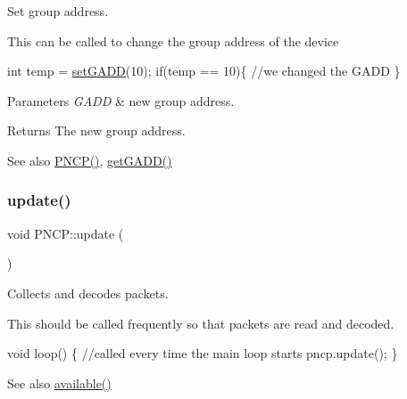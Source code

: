 Set group address. 

This can be called to change the group address of the device 
\begin{DoxyCode}
\textcolor{keywordtype}{int} temp = \hyperlink{class_p_n_c_p_a14efa4c46289d86be1a49f8e5594f396}{setGADD}(10);
\textcolor{keywordflow}{if}(temp == 10)\{
\textcolor{comment}{//we changed the GADD}
\}
\end{DoxyCode}
 
\begin{DoxyParams}{Parameters}
{\em G\+A\+DD} & new group address. \\
\hline
\end{DoxyParams}
\begin{DoxyReturn}{Returns}
The new group address. 
\end{DoxyReturn}
\begin{DoxySeeAlso}{See also}
\hyperlink{class_p_n_c_p_ade922129d20c574d2a962f3ff0cd4ea3}{P\+N\+C\+P()}, \hyperlink{class_p_n_c_p_ae885bf46891dfdc36def5b8e8337f5b8}{get\+G\+A\+D\+D()} 
\end{DoxySeeAlso}
\mbox{\label{class_p_n_c_p_ab292e3b595289320a03ed6179750942d}} 
\subsubsection{\texorpdfstring{update()}{update()}}
{\footnotesize\ttfamily void P\+N\+C\+P\+::update (\begin{DoxyParamCaption}{ }\end{DoxyParamCaption})}



Collects and decodes packets. 

This should be called frequently so that packets are read and decoded. 
\begin{DoxyCode}
  \textcolor{keywordtype}{void} loop()
  \{
  \textcolor{comment}{//called every time the main loop starts}
  pncp.update();
\}
\end{DoxyCode}


\begin{DoxySeeAlso}{See also}
\hyperlink{class_p_n_c_p_a153136448f88a3d2ac580c329620aea4}{available()} 
\end{DoxySeeAlso}
\mbox{\label{class_p_n_c_p_a510082b9d59deac16a6aa19a228c2cd7}} 
